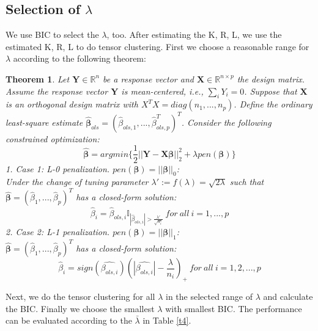 \documentclass{article}
\newtheorem{theorem}{Theorem}
\begin{document}
\subsection{Selection of $\lambda$}
We use BIC to select the $\lambda$, too. After estimating the K, R, L, we use the estimated K, R, L to do tensor clustering. First we choose a reasonable range for $\lambda$ according to the following theorem:
\begin{theorem}
	Let $\mathbf{Y} \in \mathbb{R}^n$ be a response vector and $\mathbf{X} \in \mathbb{R}^{n\times p}$ the design matrix. Assume the response vector $\mathbf{Y}$ is mean-centered, i.e., $\sum_iY_i=0$. Suppose that $\mathbf{X}$ is an orthogonal design matrix with $X^TX=diag(n_1,...,n_p)$. Define the ordinary least-square estimate $\hat{\bm{\beta}}_{ols} = (\hat{\beta}_{ols,1},...,\hat{\beta}^T_{ols,p})^T$. Consider the following constrained optimization: 
	\begin{equation*}
		\bm{
		\hat{\beta}} = argmin\{\frac{1}{2}||\mathbf{Y}-\mathbf{X}\bm{\beta}||^2_2+\lambda pen(\bm{\beta})\}
	\end{equation*}
	1. Case 1: L-0 penalization. $pen(\bm{\beta}) = ||\bm{\beta}||_0$:\\
	 Under the change of tuning parameter $\lambda' := f(\lambda)=\sqrt{2\lambda}$  such that $\bm{\hat{\beta}} = (\hat{\beta}_1,..., \hat{\beta}_p)^T$ has a closed-form solution:
	\begin{equation*}
		\hat{\beta}_i = \hat{\beta}_{ols,i}\mathbb{I}_{|\hat{\beta}_{ols,i}|>\frac{\lambda'}{\sqrt{n_i}}}\ for\ all\ i=1,...,p
	\end{equation*}
	2. Case 2: L-1 penalization. $pen(\bm{\beta})= ||\bm{\beta}||_1$:\\
	$\bm{\hat{\beta}} = (\hat{\beta}_1,..., \hat{\beta}_p)^T$ has a closed-form solution:
	\begin{equation*}
		\hat{\beta}_i = sign(\hat{\beta_{ols,i}})(|\hat{\beta_{ols,i}}|-\frac{\lambda}{n_i})_+\ for\ all\ i=1,2,...,p
	\end{equation*}
	
\end{theorem}
Next, we do the tensor clustering for all $\lambda$ in the selected range of $\lambda$ and calculate the BIC. Finally we choose the smallest $\lambda$ with smallest BIC. The performance can be evaluated according to the $\bar{\lambda}$ in Table \ref{t4}.
\end{document}
